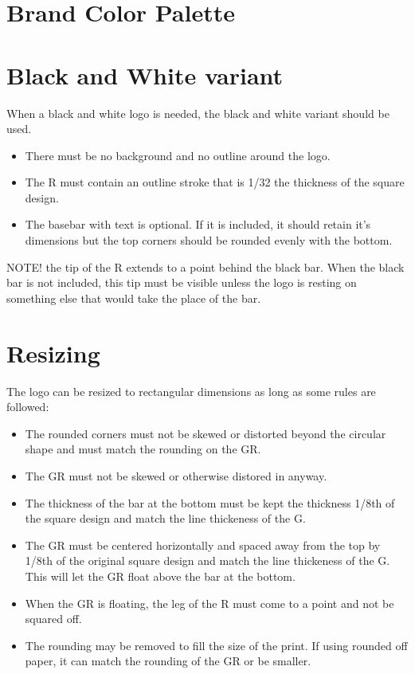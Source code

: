 \documentclass{logo_styleguide}
\begin{document}
\section{Brand Color Palette}


\section{Black and White variant}
When a black and white logo is needed, the black and white variant should be used.
\begin{itemize}
    \item There must be no background and no outline around the logo.
    \item The R must contain an outline stroke that is 1/32 the thickness of the square design.
    \item The basebar with text is optional. If it is included, it should retain it's dimensions but the top corners should be rounded evenly with the bottom.
\end{itemize}

NOTE! the tip of the R extends to a point behind the black bar. When the black bar is not included, this tip must be visible unless the logo is resting on something else that would take the place of the bar.


\section{Resizing}
The logo can be resized to rectangular dimensions as long as some rules are followed:
\begin{itemize}
    \item The rounded corners must not be skewed or distorted beyond the circular shape and must match the rounding on the GR.
    \item The GR must not be skewed or otherwise distored in anyway.
    \item The thickness of the bar at the bottom must be kept the thickness 1/8th of the square design and match the line thickeness of the G.
    \item The GR must be centered horizontally and spaced away from the top by 1/8th of the original square design and match the line thickeness of the G. This will let the GR float above the bar at the bottom.
    \item When the GR is floating, the leg of the R must come to a point and not be squared off.
    \item The rounding may be removed to fill the size of the print. If using rounded off paper, it can match the rounding of the GR or be smaller.
\end{itemize}
\end{document}
